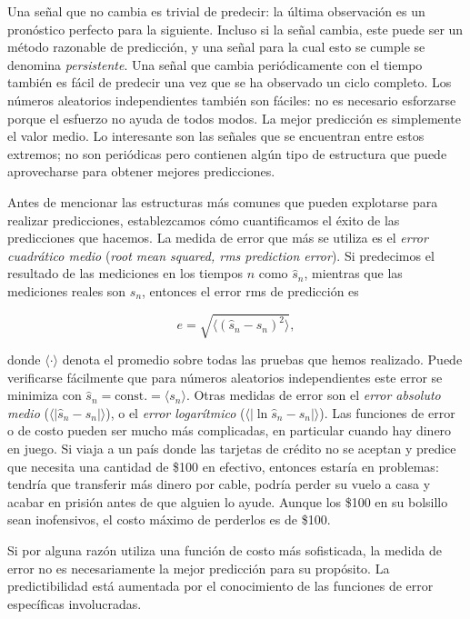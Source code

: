 \documentclass[10pt,a4paper]{book}
\begin{document}
Una señal que no cambia es trivial de predecir: la última observación es un pronóstico perfecto para la siguiente. Incluso si la señal cambia, este puede ser un método razonable de predicción, y una señal para la cual esto se cumple se denomina \textit{persistente}. Una señal que cambia periódicamente con el tiempo también es fácil de predecir una vez que se ha observado un ciclo completo. Los números aleatorios independientes también son fáciles: no es necesario esforzarse porque el esfuerzo no ayuda de todos modos. La mejor predicción es simplemente el valor medio. Lo interesante son las señales que se encuentran entre estos extremos; no son periódicas pero contienen algún tipo de estructura que puede aprovecharse para obtener mejores predicciones.

Antes de mencionar las estructuras más comunes que pueden explotarse para realizar predicciones, establezcamos cómo cuantificamos el éxito de las predicciones que hacemos. La medida de error que más se utiliza es el \textit{error cuadrático medio} (\textit{root mean squared, rms prediction error}). Si predecimos el resultado de las mediciones en los tiempos $n$ como $\hat{s}_n$, mientras que las mediciones reales son $s_n$, entonces el error rms de predicción es

\begin{equation}
e = \sqrt{\langle (\hat{s}_n - s_n)^2 \rangle} ,
\end{equation}

donde $\langle \cdot \rangle$ denota el promedio sobre todas las pruebas que hemos realizado. Puede verificarse fácilmente que para números aleatorios independientes este error se minimiza con $\hat{s}_n = \text{const.} = \langle s_n \rangle$. Otras medidas de error son el \textit{error absoluto medio} ($\langle |\hat{s}_n - s_n| \rangle$), o el \textit{error logarítmico} ($\langle |\ln \hat{s}_n - s_n| \rangle$). Las funciones de error o de costo pueden ser mucho más complicadas, en particular cuando hay dinero en juego. Si viaja a un país donde las tarjetas de crédito no se aceptan y predice que necesita una cantidad de \$100 en efectivo, entonces estaría en problemas: tendría que transferir más dinero por cable, podría perder su vuelo a casa y acabar en prisión antes de que alguien lo ayude. Aunque los \$100 en su bolsillo sean inofensivos, el costo máximo de perderlos es de \$100.

Si por alguna razón utiliza una función de costo más sofisticada, la medida de error no es necesariamente la mejor predicción para su propósito. La predictibilidad está aumentada por el conocimiento de las funciones de error específicas involucradas.
\end{document}
